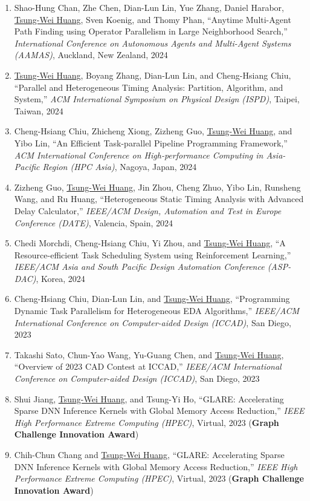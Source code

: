 \documentclass[A4,11pt]{article}
\begin{document}
\begin{enumerate}
    \item Shao-Hung Chan, Zhe Chen, Dian-Lun Lin, Yue Zhang, Daniel Harabor, \underline{Tsung-Wei Huang}, Sven Koenig, and Thomy Phan, ``Anytime Multi-Agent Path Finding using Operator Parallelism in Large Neighborhood Search,'' \textit{International Conference on Autonomous Agents and Multi-Agent Systems (AAMAS)}, Auckland, New Zealand, 2024
    \item \underline{Tsung-Wei Huang}, Boyang Zhang, Dian-Lun Lin, and Cheng-Hsiang Chiu, ``Parallel and Heterogeneous Timing Analysis: Partition, Algorithm, and System,'' \textit{ACM International Symposium on Physical Design (ISPD)}, Taipei, Taiwan, 2024
    \item Cheng-Hsiang Chiu, Zhicheng Xiong, Zizheng Guo, \underline{Tsung-Wei Huang}, and Yibo Lin, ``An Efficient Task-parallel Pipeline Programming Framework,'' \textit{ACM International Conference on High-performance Computing in Asia-Pacific Region (HPC Asia)}, Nagoya, Japan, 2024
    \item Zizheng Guo, \underline{Tsung-Wei Huang}, Jin Zhou, Cheng Zhuo, Yibo Lin, Runsheng Wang, and Ru Huang, ``Heterogeneous Static Timing Analysis with Advanced Delay Calculator,'' \textit{IEEE/ACM Design, Automation and Test in Europe Conference (DATE)}, Valencia, Spain, 2024
    \item Chedi Morchdi, Cheng-Hsiang Chiu, Yi Zhou, and \underline{Tsung-Wei Huang}, ``A Resource-efficient Task Scheduling System using Reinforcement Learning,'' \textit{IEEE/ACM Asia and South Pacific Design Automation Conference (ASP-DAC)}, Korea, 2024
    \item Cheng-Hsiang Chiu, Dian-Lun Lin, and \underline{Tsung-Wei Huang}, ``Programming Dynamic Task Parallelism for Heterogeneous EDA Algorithms,'' \textit{IEEE/ACM International Conference on Computer-aided Design (ICCAD)}, San Diego, 2023
    \item Takashi Sato, Chun-Yao Wang, Yu-Guang Chen, and \underline{Tsung-Wei Huang}, ``Overview of 2023 CAD Contest at ICCAD,'' \textit{IEEE/ACM International Conference on Computer-aided Design (ICCAD)}, San Diego, 2023
    \item Shui Jiang, \underline{Tsung-Wei Huang}, and Tsung-Yi Ho, ``GLARE: Accelerating Sparse DNN Inference Kernels with Global Memory Access Reduction,'' \textit{IEEE High Performance Extreme Computing (HPEC)}, Virtual, 2023 (\textbf{Graph Challenge Innovation Award})
    \item Chih-Chun Chang and \underline{Tsung-Wei Huang}, ``GLARE: Accelerating Sparse DNN Inference Kernels with Global Memory Access Reduction,'' \textit{IEEE High Performance Extreme Computing (HPEC)}, Virtual, 2023 (\textbf{Graph Challenge Innovation Award})

\end{enumerate}
\end{document}
